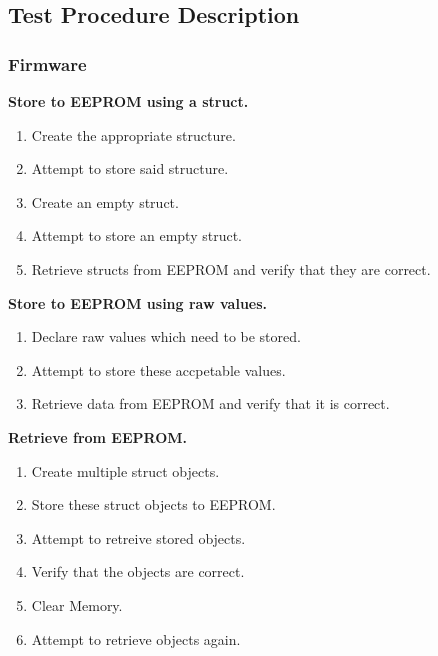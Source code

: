 \documentclass[a4paper,10pt]{article}
\begin{document}
	\subsection{Test Procedure Description}
		\subsubsection{Firmware}
		\textbf{Store to EEPROM using a struct.}
			\begin{enumerate}
				\item Create the appropriate structure.
				\item Attempt to store said structure.
				\item Create an empty struct.
				\item Attempt to store an empty struct.
				\item Retrieve structs from EEPROM and verify that they are correct.
			\end{enumerate}
		\textbf{Store to EEPROM using raw values.}
			\begin{enumerate}
				\item Declare raw values which need to be stored.
				\item Attempt to store these accpetable values.
				\item Retrieve data from EEPROM and verify that it is correct. 
			\end{enumerate}
		\textbf{Retrieve from EEPROM.}
			\begin{enumerate}
				\item Create multiple struct objects.
				\item Store these struct objects to EEPROM.
				\item Attempt to retreive stored objects.
				\item Verify that the objects are correct.
				\item Clear Memory.
				\item Attempt to retrieve objects again.
			\end{enumerate}
			
\end{document}
